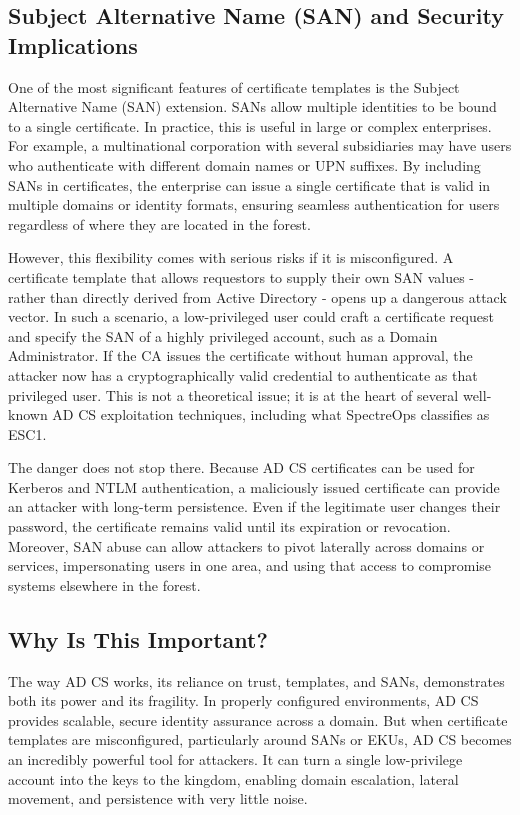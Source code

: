 \subsection{Subject Alternative Name (SAN) and Security Implications}
One of the most significant features of certificate templates is the Subject Alternative Name (SAN) extension. SANs allow multiple identities to be bound to a single certificate. In practice, this is useful in large or complex enterprises. For example, a multinational corporation with several subsidiaries may have users who authenticate with different domain names or UPN suffixes. By including SANs in certificates, the enterprise can issue a single certificate that is valid in multiple domains or identity formats, ensuring seamless authentication for users regardless of where they are located in the forest.

However, this flexibility comes with serious risks if it is misconfigured. A certificate template that allows requestors to supply their own SAN values - rather than directly derived from Active Directory - opens up a dangerous attack vector. In such a scenario, a low-privileged user could craft a certificate request and specify the SAN of a highly privileged account, such as a Domain Administrator. If the CA issues the certificate without human approval, the attacker now has a cryptographically valid credential to authenticate as that privileged user. This is not a theoretical issue; it is at the heart of several well-known AD CS exploitation techniques, including what SpectreOps classifies as ESC1.

The danger does not stop there. Because AD CS certificates can be used for Kerberos and NTLM authentication, a maliciously issued certificate can provide an attacker with long-term persistence. Even if the legitimate user changes their password, the certificate remains valid until its expiration or revocation. Moreover, SAN abuse can allow attackers to pivot laterally across domains or services, impersonating users in one area, and using that access to compromise systems elsewhere in the forest.

\subsection{Why Is This Important?}
The way AD CS works, its reliance on trust, templates, and SANs, demonstrates both its power and its fragility. In properly configured environments, AD CS provides scalable, secure identity assurance across a domain. But when certificate templates are misconfigured, particularly around SANs or EKUs, AD CS becomes an incredibly powerful tool for attackers. It can turn a single low-privilege account into the keys to the kingdom, enabling domain escalation, lateral movement, and persistence with very little noise.

